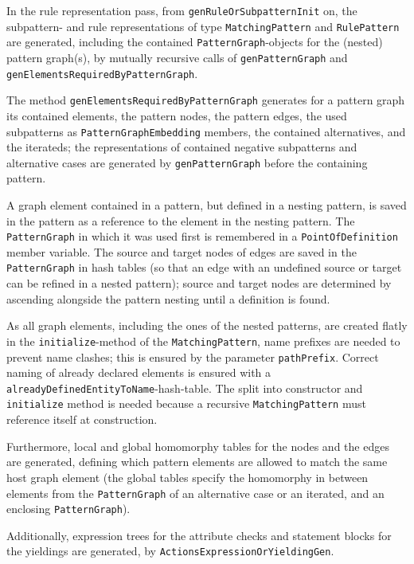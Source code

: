 In the rule representation pass, from \texttt{gen\-Rule\-Or\-Subpattern\-Init} on, the subpattern- and rule representations of type \texttt{Matching\-Pattern} and \texttt{Rule\-Pattern} are generated, including the contained \texttt{Pattern\-Graph}-objects for the (nested) pattern graph(s), by mutually recursive calls of \texttt{gen\-Pattern\-Graph} and \texttt{gen\-Elements\-Required\-By\-Pattern\-Graph}.

The method \texttt{gen\-Elements\-Required\-By\-Pattern\-Graph} generates for a pattern graph its contained elements, the pattern nodes, the pattern edges, the used subpatterns as \texttt{Pattern\-Graph\-Embedding} members, the contained alternatives, and the iterateds; the representations of contained negative subpatterns and alternative cases are generated by \texttt{gen\-Pattern\-Graph} before the containing pattern. 

A graph element contained in a pattern, but defined in a nesting pattern, is saved in the pattern as a reference to the element in the nesting pattern. 
The \texttt{Pattern\-Graph} in which it was used first is remembered in a \texttt{Point\-Of\-Definition} member variable.
The source and target nodes of edges are saved in the \texttt{Pattern\-Graph} in hash tables (so that an edge with an undefined source or target can be refined in a nested pattern); source and target nodes are determined by ascending alongside the pattern nesting until a definition is found.

As all graph elements, including the ones of the nested patterns, are created flatly in the \texttt{initialize}-method of the \texttt{Matching\-Pattern}, name prefixes are needed to prevent name clashes; this is ensured by the parameter \texttt{path\-Prefix}.
Correct naming of already declared elements is ensured with a \texttt{already\-Defined\-Entity\-To\-Name}-hash-table.
The split into constructor and \texttt{initialize} method is needed because a recursive \texttt{Matching\-Pattern} must reference itself at construction.

Furthermore, local and global homomorphy tables for the nodes and the edges are generated, defining which pattern elements are allowed to match the same host graph element (the global tables specify the homomorphy in between elements from the \texttt{Pattern\-Graph} of an alternative case or an iterated, and an enclosing \texttt{Pattern\-Graph}).

Additionally, expression trees for the attribute checks and statement blocks for the yieldings are generated, by \texttt{ActionsExpressionOrYieldingGen}.

